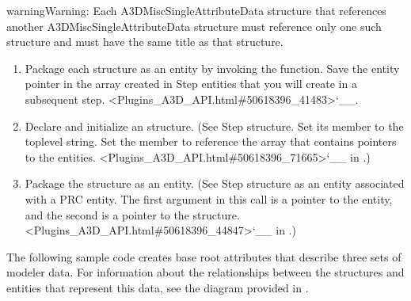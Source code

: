 \documentclass[letterpaper,12pt,english,openany,oneside]{sphinxmanual}
\begin{document}
\begin{sphinxadmonition}{warning}{Warning:}
Each A3DMiscSingleAttributeData structure that references another A3DMiscSingleAttributeData structure must reference only one such structure and must have the same title as that structure.
\end{sphinxadmonition}
\begin{enumerate}
%
\setcounter{enumi}{4}
\item {} 
Package each  structure as an  entity by invoking the  function. Save the entity pointer in the array created in Step  entities that you will create in a subsequent step. <Plugins\_A3D\_API.html\#50618396\_41483>`\_\_.

\item {} 
Declare and initialize an  structure. (See Step  structure. Set its  member to the top\sphinxhyphen{}level string. Set the  member to reference the array that contains pointers to the  entities. <Plugins\_A3D\_API.html\#50618396\_71665>`\_\_ in .)

\item {} 
Package the  structure as an  entity. (See Step  structure as an  entity associated with a PRC entity. The first argument in this call is a pointer to the entity, and the second is a pointer to the  structure. <Plugins\_A3D\_API.html\#50618396\_44847>`\_\_ in .)

\end{enumerate}

The following sample code creates base root attributes that describe three sets of modeler data. For information about the relationships between the structures and entities that represent this data, see the diagram provided in .
\end{document}
